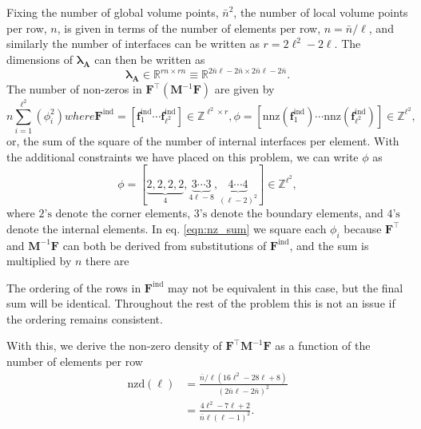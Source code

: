 Fixing the number of global volume points, $\bar{n}^2$, the number of local volume points per row, $n$, is given in terms of the number of elements per row, $n = \bar{n} / \ell$, and similarly the number of interfaces can be written as $r = 2\ell^2 - 2\ell$. The dimensions of $\symbf{\lambda}_\textbf{A}$ can then be written as 
\begin{equation}
	\symbf{\lambda}_\textbf{A} \in \mathbb{R}^{rn \times rn} \equiv \mathbb{R}^{2\bar{n}\ell - 2\bar{n} \times 2\bar{n}\ell - 2\bar{n}}. 
\end{equation}
The number of non-zeros in $\textbf{F}^{\intercal}(\textbf{M}^{-1}\textbf{F})$ are given by
\begin{subequations}
\begin{equation}
	n \sum_{i=1}^{\ell^2} (\phi_i^2)
	\label{eqn:nz_sum}
\end{equation}
where
\begin{equation}
	\textbf{F}^{\text{ind}} = \left[\textbf{f}^{\text{ind}}_1 \cdots \textbf{f}^{\text{ind}}_{\ell^2}\right] \in \mathbb{Z}^{\ell^2 \times r},
\end{equation}
\begin{equation}
	\phi = \left[ \text{nnz}(\textbf{f}^{\text{ind}}_1) \cdots \text{nnz}(\textbf{f}^{\text{ind}}_{\ell^2}) \right] \in \mathbb{Z}^{\ell^2}, 
\end{equation}
\end{subequations}
or, the sum of the square of the number of internal interfaces per element. With the additional constraints we have placed on this problem, we can write $\phi$ as 
\begin{equation}
	\phi = \left[ \underbrace{2, 2, 2, 2}_{4}, \underbrace{3 \cdots 3}_{4\ell - 8}, \underbrace{4 \cdots 4}_{(\ell-2)^2} \right] \in \mathbb{Z}^{\ell^2}, 
\end{equation}
where $2\text{'s}$ denote the corner elements, $3\text{'s}$ denote the boundary elements, and $4\text{'s}$ denote the internal elements. In eq. \eqref{eqn:nz_sum} we square each $\phi_i$ because $\textbf{F}^{\intercal}$ and  $\textbf{M}^{-1}\textbf{F}$ can both be derived from substitutions of $\textbf{F}^{\text{ind}}$, and the sum is multiplied by $n$ there are 

The ordering of the rows in $\textbf{F}^{\text{ind}}$ may not be equivalent in this case, but the final sum will be identical. Throughout the rest of the problem this is not an issue if the ordering remains consistent. 

With this, we derive the non-zero density of $\textbf{F}^{\intercal}\textbf{M}^{-1}\textbf{F}$ as a function of the number of elements per row 
\begin{equation}
	\begin{aligned}
	\text{nzd}(\ell) &= \frac{\bar{n}/\ell (16\ell^2 - 28\ell + 8)}{(2\bar{n}\ell - 2\bar{n})^2} \\
	&= \frac{4\ell^2 - 7\ell + 2}{\bar{n}\ell(\ell-1)^2}.
	\end{aligned}
\end{equation}

